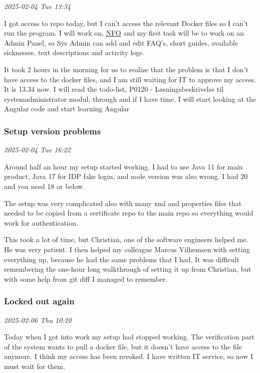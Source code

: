 \documentclass[../main.tex]{subfiles}
\begin{document}
\textit{2025-02-04 Tue 13:34}

I got access to repo today, but I can't access the relevant Docker files so I can't run the program. I will work on, \href{https://nationaltforsoegsoverblik.dk/}{NFO} and my first task will be to work on an Admin Panel, so Sys Admin can add and edit FAQ's, short guides, available sicknesses, text descriptions and activity logs.

It took 2 hours in the morning for us to realize that the problem is that I don't have access to the docker files, and I am still waiting for IT to approve my access. It is 13.34 now. I will read the todo-list, P0120 - Løsningsbeskrivelse til systemadministrator modul, through and if I have time, I will start looking at the Angular code and start learning Angular

\subsubsection{Setup version problems}

\textit{2025-02-04 Tue 16:22}

Around half an hour my setup started working. I had to use Java 11 for main product, Java 17 for IDP fake login, and node version was also wrong. I had 20 and you need 18 or below.

The setup was very complicated also with many xml and properties files that needed to be copied from a certificate repo to the main repo so everything would work for authentication.

This took a lot of time, but Christian, one of the software engineers helped me. He was very patient. I then helped my colleague Marcus Vilhemsen with setting everything up, because he had the same problems that I had. It was difficult remembering the one-hour long walkthrough of setting it up from Christian, but with some help from git diff I managed to remember.

\subsubsection{Locked out again}

\textit{2025-02-06 Thu 10:20}

Today when I got into work my setup had stopped working. The verification part of the system wants to pull a docker file, but it doesn't have access to the file anymore. I think my access has been revoked. I have written IT service, so now I must wait for them.
\end{document}
